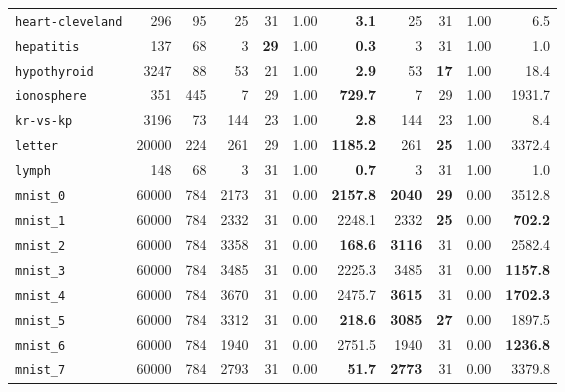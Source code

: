 \begin{tabular}{lccrrrrrrrr}
\texttt{heart-cleveland} & \multicolumn{1}{r}{296} & \multicolumn{1}{r}{95}  & 25 & 31 & 1.00 & \textbf{3.1} & 25 & 31 & 1.00 & 6.5\\
\texttt{hepatitis} & \multicolumn{1}{r}{137} & \multicolumn{1}{r}{68}  & 3 & \textbf{29} & 1.00 & \textbf{0.3} & 3 & 31 & 1.00 & 1.0\\
\texttt{hypothyroid} & \multicolumn{1}{r}{3247} & \multicolumn{1}{r}{88}  & 53 & 21 & 1.00 & \textbf{2.9} & 53 & \textbf{17} & 1.00 & 18.4\\
\texttt{ionosphere} & \multicolumn{1}{r}{351} & \multicolumn{1}{r}{445}  & 7 & 29 & 1.00 & \textbf{729.7} & 7 & 29 & 1.00 & 1931.7\\
\texttt{kr-vs-kp} & \multicolumn{1}{r}{3196} & \multicolumn{1}{r}{73}  & 144 & 23 & 1.00 & \textbf{2.8} & 144 & 23 & 1.00 & 8.4\\
\texttt{letter} & \multicolumn{1}{r}{20000} & \multicolumn{1}{r}{224}  & 261 & 29 & 1.00 & \textbf{1185.2} & 261 & \textbf{25} & 1.00 & 3372.4\\
\texttt{lymph} & \multicolumn{1}{r}{148} & \multicolumn{1}{r}{68}  & 3 & 31 & 1.00 & \textbf{0.7} & 3 & 31 & 1.00 & 1.0\\
\texttt{mnist\_0} & \multicolumn{1}{r}{60000} & \multicolumn{1}{r}{784}  & 2173 & 31 & 0.00 & \textbf{2157.8} & \textbf{2040} & \textbf{29} & 0.00 & 3512.8\\
\texttt{mnist\_1} & \multicolumn{1}{r}{60000} & \multicolumn{1}{r}{784}  & 2332 & 31 & 0.00 & 2248.1 & 2332 & \textbf{25} & 0.00 & \textbf{702.2}\\
\texttt{mnist\_2} & \multicolumn{1}{r}{60000} & \multicolumn{1}{r}{784}  & 3358 & 31 & 0.00 & \textbf{168.6} & \textbf{3116} & 31 & 0.00 & 2582.4\\
\texttt{mnist\_3} & \multicolumn{1}{r}{60000} & \multicolumn{1}{r}{784}  & 3485 & 31 & 0.00 & 2225.3 & 3485 & 31 & 0.00 & \textbf{1157.8}\\
\texttt{mnist\_4} & \multicolumn{1}{r}{60000} & \multicolumn{1}{r}{784}  & 3670 & 31 & 0.00 & 2475.7 & \textbf{3615} & 31 & 0.00 & \textbf{1702.3}\\
\texttt{mnist\_5} & \multicolumn{1}{r}{60000} & \multicolumn{1}{r}{784}  & 3312 & 31 & 0.00 & \textbf{218.6} & \textbf{3085} & \textbf{27} & 0.00 & 1897.5\\
\texttt{mnist\_6} & \multicolumn{1}{r}{60000} & \multicolumn{1}{r}{784}  & 1940 & 31 & 0.00 & 2751.5 & 1940 & 31 & 0.00 & \textbf{1236.8}\\
\texttt{mnist\_7} & \multicolumn{1}{r}{60000} & \multicolumn{1}{r}{784}  & 2793 & 31 & 0.00 & \textbf{51.7} & \textbf{2773} & 31 & 0.00 & 3379.8\\

\end{tabular}

